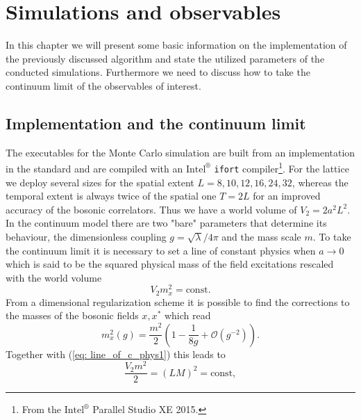 \chapter{Simulations and observables}
In this chapter we will present some basic information on the implementation of the previously discussed algorithm and state the utilized parameters of the conducted simulations. Furthermore we need to discuss how to take the continuum limit of the observables of interest.
%
%
%
%
%
%
\section{Implementation and the continuum limit}
The executables for the Monte Carlo simulation are built from an implementation in the  standard and are compiled with an $\text{Intel}^{\circledR}$ \texttt{ifort} compiler\footnote{From the $\text{Intel}^{\circledR}$ Parallel Studio XE 2015.}. For the lattice we deploy several sizes for the spatial extent $L=8,10,12,16,24,32$, whereas the temporal extent is always twice of the spatial one $T=2L$ for an improved accuracy of the bosonic correlators. Thus we have a world volume of $V_{2}=2a^{2}L^{2}$. In the continuum model there are two "bare" parameters that determine its behaviour, the dimensionless coupling $g=\sqrt{\lambda}/4\pi$ and the mass scale $m$. To take the continuum limit it is necessary to set a line of constant physics when $a \to 0$ which is said to be the squared physical mass of the field excitations rescaled with the world volume
%
%
\begin{equation}
V_{2}m_{x}^{2} = \text{const}.
\label{eq: line_of_c_phys1}
\end{equation}
%
%
From a dimensional regularization scheme it is possible to find the corrections to the masses of the bosonic fields $x,x^{*}$ which read \cite{Giombi:2010bj}
%
%
\begin{equation}
m_{x}^{2}(g) = \frac{m^{2}}{2}\left(1 - \frac{1}{8g} + \mathcal{O}(g^{-2}) \right).
\label{eq: m_x}
\end{equation}
%
%
Together with (\ref{eq: line_of_c_phys1}) this leads to 
%
%
\begin{equation}
\frac{V_{2}m^{2}}{2} = (LM)^{2} = \text{const},
\label{eq: line_of_c_phys2}
\end{equation}
%
%
